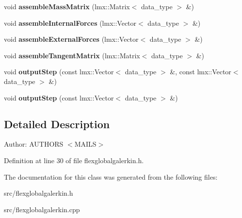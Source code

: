 \begin{CompactItemize}
\item 
\hypertarget{classmknix_1_1FlexGlobalGalerkin_689a56babe9734eb504a9c948b6a3587}{
void \textbf{assembleMassMatrix} (lmx::Matrix$<$ data\_\-type $>$ \&)}
\label{classmknix_1_1FlexGlobalGalerkin_689a56babe9734eb504a9c948b6a3587}

\item 
\hypertarget{classmknix_1_1FlexGlobalGalerkin_53478bc093d332f42128861a059c974c}{
void \textbf{assembleInternalForces} (lmx::Vector$<$ data\_\-type $>$ \&)}
\label{classmknix_1_1FlexGlobalGalerkin_53478bc093d332f42128861a059c974c}

\item 
\hypertarget{classmknix_1_1FlexGlobalGalerkin_cc0254dbedc2543be9051aab1acb7d99}{
void \textbf{assembleExternalForces} (lmx::Vector$<$ data\_\-type $>$ \&)}
\label{classmknix_1_1FlexGlobalGalerkin_cc0254dbedc2543be9051aab1acb7d99}

\item 
\hypertarget{classmknix_1_1FlexGlobalGalerkin_b5ddc03826dcf8dea98fd53093b2dfe7}{
void \textbf{assembleTangentMatrix} (lmx::Matrix$<$ data\_\-type $>$ \&)}
\label{classmknix_1_1FlexGlobalGalerkin_b5ddc03826dcf8dea98fd53093b2dfe7}

\item 
\hypertarget{classmknix_1_1FlexGlobalGalerkin_031a130b73e3fe0fc862393f94d235cb}{
void \textbf{outputStep} (const lmx::Vector$<$ data\_\-type $>$ \&, const lmx::Vector$<$ data\_\-type $>$ \&)}
\label{classmknix_1_1FlexGlobalGalerkin_031a130b73e3fe0fc862393f94d235cb}

\item 
\hypertarget{classmknix_1_1FlexGlobalGalerkin_1882efa0a8f8c8832f6116b8f7874d2a}{
void \textbf{outputStep} (const lmx::Vector$<$ data\_\-type $>$ \&)}
\label{classmknix_1_1FlexGlobalGalerkin_1882efa0a8f8c8832f6116b8f7874d2a}

\end{CompactItemize}


\subsection{Detailed Description}
\begin{Desc}
\item[Author:]AUTHORS $<$MAILS$>$ \end{Desc}


Definition at line 30 of file flexglobalgalerkin.h.

The documentation for this class was generated from the following files:\begin{CompactItemize}
\item 
src/flexglobalgalerkin.h\item 
src/flexglobalgalerkin.cpp\end{CompactItemize}
